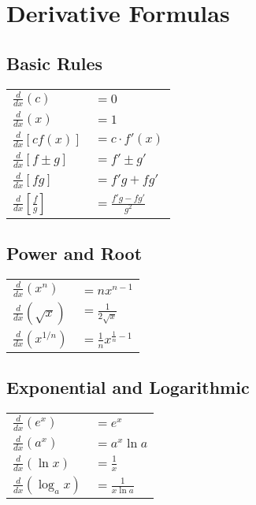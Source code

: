 \documentclass[12pt]{article}
\begin{document}
\section*{Derivative Formulas}

\subsection*{Basic Rules}
\begin{tabular}{@{}ll@{}}
\toprule
$\displaystyle \frac{d}{dx}(c)$ & $= 0$ \\
$\displaystyle \frac{d}{dx}(x)$ & $= 1$ \\
$\displaystyle \frac{d}{dx}[cf(x)]$ & $= c \cdot f'(x)$ \\
$\displaystyle \frac{d}{dx}[f \pm g]$ & $= f' \pm g'$ \\
$\displaystyle \frac{d}{dx}[fg]$ & $= f'g + fg'$ \\
$\displaystyle \frac{d}{dx}\left[\frac{f}{g}\right]$ & $= \frac{f'g - fg'}{g^2}$ \\
\bottomrule
\end{tabular}

\vspace{1em}
\subsection*{Power and Root}
\begin{tabular}{@{}ll@{}}
\toprule
$\displaystyle \frac{d}{dx}(x^n)$ & $= nx^{n-1}$ \\
$\displaystyle \frac{d}{dx}(\sqrt{x})$ & $= \frac{1}{2\sqrt{x}}$ \\
$\displaystyle \frac{d}{dx}(x^{1/n})$ & $= \frac{1}{n}x^{\frac{1}{n}-1}$ \\
\bottomrule
\end{tabular}

\vspace{1em}
\subsection*{Exponential and Logarithmic}
\begin{tabular}{@{}ll@{}}
\toprule
$\displaystyle \frac{d}{dx}(e^x)$ & $= e^x$ \\
$\displaystyle \frac{d}{dx}(a^x)$ & $= a^x \ln a$ \\
$\displaystyle \frac{d}{dx}(\ln x)$ & $= \frac{1}{x}$ \\
$\displaystyle \frac{d}{dx}(\log_a x)$ & $= \frac{1}{x \ln a}$ \\
\bottomrule
\end{tabular}
\end{document}
